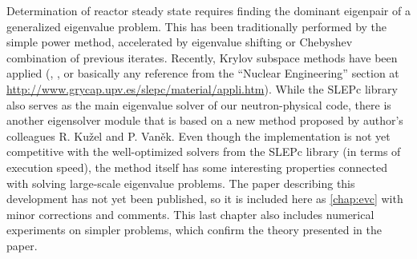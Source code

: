 {
Determination of reactor steady state requires finding the dominant eigenpair of a generalized eigenvalue problem. This
has been traditionally performed by the simple power method, accelerated by eigenvalue shifting or Chebyshev
combination of previous iterates. Recently, Krylov subspace methods have been applied (\cite{warsa}, \cite{Subramanian},
or basically any reference from the ``Nuclear Engineering'' section at
\url{http://www.grycap.upv.es/slepc/material/appli.htm}). While the SLEPc library also serves as the main eigenvalue
solver of our neutron-physical code, there is another eigensolver module that is based on a new method
proposed by author's colleagues R. Ku{\v z}el and P. Van{\v e}k. Even though the implementation is not yet competitive with the well-optimized
solvers from the SLEPc library (in terms of execution speed), the method itself has some interesting properties
connected with solving large-scale eigenvalue problems. The paper describing this development has not yet been 
published, so it is included here as \cref{chap:evc} with minor corrections and comments. This last chapter also
includes numerical experiments on simpler problems, which confirm the theory presented in the paper.
}
